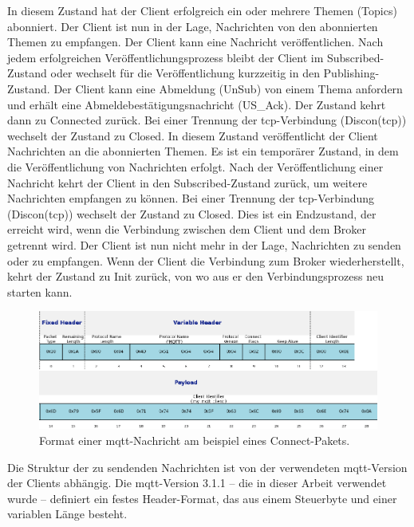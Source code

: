 In diesem Zustand hat der Client erfolgreich ein oder mehrere Themen (Topics) abonniert.
Der Client ist nun in der Lage, Nachrichten von den abonnierten Themen zu empfangen.
Der Client kann eine Nachricht veröffentlichen.\newline
Nach jedem erfolgreichen Veröffentlichungsprozess bleibt der Client im Subscribed-Zustand oder wechselt für die Veröffentlichung
kurzzeitig in den Publishing-Zustand.
Der Client kann eine Abmeldung (UnSub) von einem Thema anfordern und erhält eine Abmeldebestätigungsnachricht (US\_Ack).
Der Zustand kehrt dann zu Connected zurück.
Bei einer Trennung der \gls{tcp}-Verbindung (Discon(\gls{tcp})) wechselt der Zustand zu Closed.
In diesem Zustand veröffentlicht der Client Nachrichten an die abonnierten Themen.\newline
Es ist ein temporärer Zustand, in dem die Veröffentlichung von Nachrichten erfolgt.
Nach der Veröffentlichung einer Nachricht kehrt der Client in den Subscribed-Zustand zurück, um weitere Nachrichten empfangen zu können.
Bei einer Trennung der \gls{tcp}-Verbindung (Discon(\gls{tcp})) wechselt der Zustand zu Closed.\newline
Dies ist ein Endzustand, der erreicht wird, wenn die Verbindung zwischen dem Client und dem Broker getrennt wird.
Der Client ist nun nicht mehr in der Lage, Nachrichten zu senden oder zu empfangen.
Wenn der Client die Verbindung zum Broker wiederherstellt, kehrt der Zustand zu Init zurück, von wo aus er den Verbindungsprozess
neu starten kann.
\begin{figure}[H]
    \centering
    \includegraphics[width=\textwidth]{img/mqtt_packet_structure}
    \caption{Format einer \gls{mqtt}-Nachricht am beispiel eines Connect-Pakets.}
    \label{fig:mqtt_message_format}
\end{figure}
\noindent Die Struktur der zu sendenden Nachrichten ist von der verwendeten \gls{mqtt}-Version der Clients abhängig.
Die \gls{mqtt}-Version 3.1.1 -- die in dieser Arbeit verwendet wurde -- definiert ein festes Header-Format, das aus einem
Steuerbyte und einer variablen Länge besteht.
